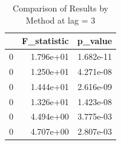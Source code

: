 \begin{table}
\caption{Comparison of Results by Method at lag = 3}
\label{tab:results_by_method}
\begin{tabular}{lrr}
\toprule
 & F\_statistic & p\_value \\
\midrule
0 & 1.796e+01 & 1.682e-11 \\
0 & 1.250e+01 & 4.271e-08 \\
0 & 1.444e+01 & 2.616e-09 \\
0 & 1.326e+01 & 1.423e-08 \\
0 & 4.494e+00 & 3.775e-03 \\
0 & 4.707e+00 & 2.807e-03 \\
\bottomrule
\end{tabular}
\end{table}
